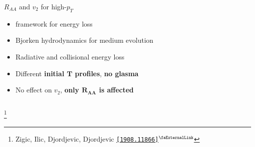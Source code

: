 \documentclass[aspectratio=169,11pt,usenames,dvipsnames]{beamer}
\renewcommand{\thefootnote}{\color{customblue}\faPaperPlaneO}
\newcommand\blfootnote[1]{%
  \begingroup
  \renewcommand\thefootnote{}\footnote{#1}%
  \addtocounter{footnote}{-1}%
  \endgroup
}
\begin{document}
\begin{frame}[t,noframenumbering]
\begin{columns}[onlytextwidth,t]
        \begin{center}
            {\Large\color{palteal} $R_{AA}$ and $v_2$ for high-$p_T$ \\[10pt]}
            \footnotesize
                \begin{itemize}
                    \item {\color{lightgray}{\bfseries DREENA} framework for energy loss}
                    \item {\color{lightgray}Bjorken hydrodynamics for medium evolution}
                    \item {\color{lightgray}Radiative and collisional energy loss}
                    \item {\color{lightgray}Different {\bfseries initial $\boldsymbol{T}$ profiles}, {\bfseries\color{jyured} no glasma}}
                    \item {\color{lightgray}No effect on $v_2$, {\bfseries only $\boldsymbol{R_{AA}}$ is affected}}
                \end{itemize}
        \end{center}
    \end{columns}
    \blfootnote{\scriptsize Zigic, Ilic, Djordjevic, Djordjevic \href{https://arxiv.org/abs/1908.11866}{\color{palgold}\texttt{[1908.11866]}$^\text{\scalebox{0.9}{\faExternalLink}}$}}
\end{frame}


\end{document}
